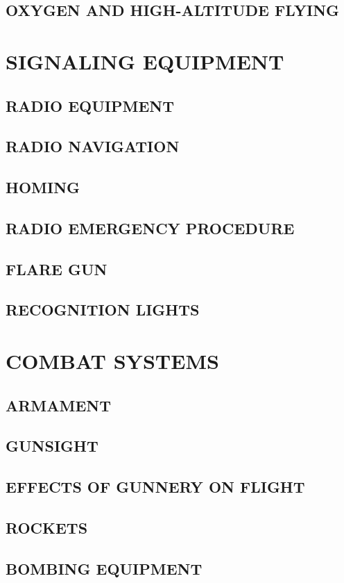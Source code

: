 \subsection{OXYGEN AND HIGH-ALTITUDE FLYING}


\section{SIGNALING EQUIPMENT}
\subsection{RADIO EQUIPMENT}
\subsection{RADIO NAVIGATION}
\subsection{HOMING}
\subsection{RADIO EMERGENCY PROCEDURE}
\subsection{FLARE GUN}
\subsection{RECOGNITION LIGHTS}


\section{COMBAT SYSTEMS}
\subsection{ARMAMENT}
\subsection{GUNSIGHT}
\subsection{EFFECTS OF GUNNERY ON FLIGHT}
\subsection{ROCKETS}
\subsection{BOMBING EQUIPMENT}
